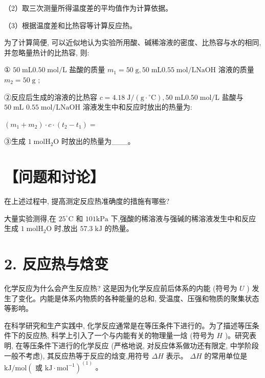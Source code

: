 \documentclass[10pt]{article}
\begin{document}

（2）取三次测量所得温度差的平均值作为计算依据。

（3）根据温度差和比热容等计算反应热。

为了计算简便, 可以近似地认为实验所用酸、碱稀溶液的密度、比热容与水的相同, 并忽略量热计的比热容, 则:

① \({50}\mathrm{\;{mL}}{0.50}\mathrm{\;{mol}}/\mathrm{L}\) 盐酸的质量 \({m}_{1} = {50}\mathrm{\;g},{50}\mathrm{\;{mL}}{0.55}\mathrm{\;{mol}}/\mathrm{L}\mathrm{{NaOH}}\) 溶液的质量 \({m}_{2} = {50}\mathrm{\;g}\) ;

②反应后生成的溶液的比热容 \(c = {4.18}\mathrm{\;J}/\left( {\mathrm{g} \cdot {}^{ \circ }\mathrm{C}}\right) ,{50}\mathrm{\;{mL}}{0.50}\mathrm{\;{mol}}/\mathrm{L}\) 盐酸与 \({50}\mathrm{\;{mL}}\) \({0.55}\mathrm{\;{mol}}/\mathrm{L}\mathrm{{NaOH}}\) 溶液发生中和反应时放出的热量为:

\(\left( {{m}_{1} + {m}_{2}}\right) \cdot c \cdot \left( {{t}_{2} - {t}_{1}}\right) =\)

③生成 \(1\mathrm{\;{mol}}{\mathrm{H}}_{2}\mathrm{O}\) 时放出的热量为\_\_\_。

\section*{【问题和讨论】}

在上述过程中, 提高测定反应热准确度的措施有哪些?

大量实验测得,在 \({25}^{ \circ }\mathrm{C}\) 和 \({101}\mathrm{{kPa}}\) 下,强酸的稀溶液与强碱的稀溶液发生中和反应生成 \(1\mathrm{\;{mol}}{\mathrm{H}}_{2}\mathrm{O}\) 时,放出 \({57.3}\mathrm{\;{kJ}}\) 的热量。

\section*{2. 反应热与焓变}

化学反应为什么会产生反应热? 这是因为化学反应前后体系的内能 (符号为 \(U\) ) 发生了变化。内能是体系内物质的各种能量的总和, 受温度、压强和物质的聚集状态等影响。

在科学研究和生产实践中, 化学反应通常是在等压条件下进行的。为了描述等压条件下的反应热, 科学上引入了一个与内能有关的物理量一焓 (符号为 \(H\) )。研究表明, 在等压条件下进行的化学反应 (严格地说, 对反应体系做功还有限定, 中学阶段一般不考虑), 其反应热等于反应的焓变,用符号 \({\Delta H}\) 表示。 \({\Delta H}\) 的常用单位是 \(\mathrm{{kJ}}/\mathrm{{mol}}{\left( \text{ 或 }\mathrm{{kJ}} \cdot {\mathrm{{mol}}}^{-1}\right) }^{\left( 1\right) }\) 。
\end{document}
